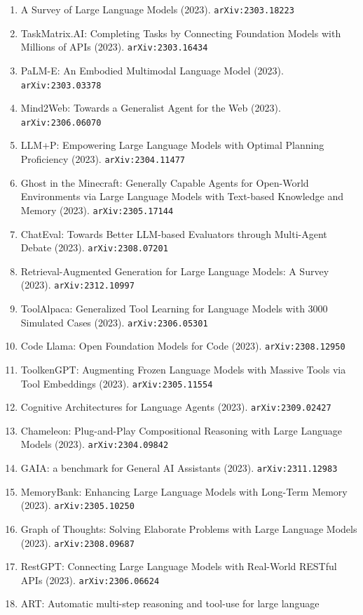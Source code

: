 \documentclass[11pt]{article}
\begin{document}
\begin{enumerate}
  \item A Survey of Large Language Models (2023). \texttt{arXiv:2303.18223}
  \item TaskMatrix.AI: Completing Tasks by Connecting Foundation Models with
  Millions of APIs (2023). \texttt{arXiv:2303.16434}
  \item PaLM-E: An Embodied Multimodal Language Model (2023). \texttt{arXiv:2303.03378}
  \item Mind2Web: Towards a Generalist Agent for the Web (2023). \texttt{arXiv:2306.06070}
  \item LLM+P: Empowering Large Language Models with Optimal Planning
  Proficiency (2023). \texttt{arXiv:2304.11477}
  \item Ghost in the Minecraft: Generally Capable Agents for Open-World
  Environments via Large Language Models with Text-based Knowledge and Memory (2023). \texttt{arXiv:2305.17144}
  \item ChatEval: Towards Better LLM-based Evaluators through Multi-Agent Debate (2023). \texttt{arXiv:2308.07201}
  \item Retrieval-Augmented Generation for Large Language Models: A Survey (2023). \texttt{arXiv:2312.10997}
  \item ToolAlpaca: Generalized Tool Learning for Language Models with 3000
  Simulated Cases (2023). \texttt{arXiv:2306.05301}
  \item Code Llama: Open Foundation Models for Code (2023). \texttt{arXiv:2308.12950}
  \item ToolkenGPT: Augmenting Frozen Language Models with Massive Tools via
  Tool Embeddings (2023). \texttt{arXiv:2305.11554}
  \item Cognitive Architectures for Language Agents (2023). \texttt{arXiv:2309.02427}
  \item Chameleon: Plug-and-Play Compositional Reasoning with Large Language
  Models (2023). \texttt{arXiv:2304.09842}
  \item GAIA: a benchmark for General AI Assistants (2023). \texttt{arXiv:2311.12983}
  \item MemoryBank: Enhancing Large Language Models with Long-Term Memory (2023). \texttt{arXiv:2305.10250}
  \item Graph of Thoughts: Solving Elaborate Problems with Large Language Models (2023). \texttt{arXiv:2308.09687}
  \item RestGPT: Connecting Large Language Models with Real-World RESTful APIs (2023). \texttt{arXiv:2306.06624}
  \item ART: Automatic multi-step reasoning and tool-use for large language

\end{enumerate}
\end{document}
